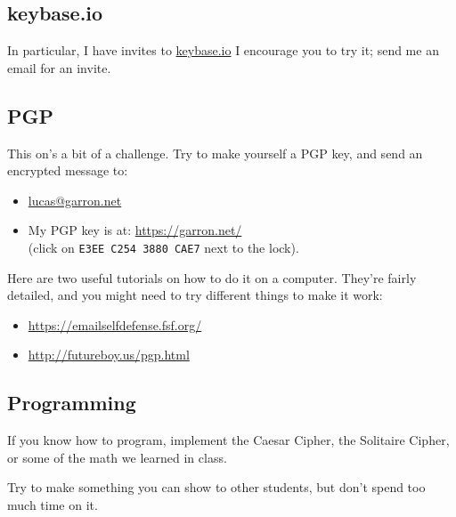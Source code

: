 \documentclass[12pt]{article}
\begin{document}
\subsection*{keybase.io}

In particular, I have invites to \href{https://keybase.io/}{keybase.io}
I encourage you to try it; send me an email for an invite.


\subsection*{PGP}

This on's a bit of a challenge. Try to make yourself a PGP key, and send an encrypted message to:

\begin{itemize}
\item \href{mailto:lucas@garron.net}{lucas@garron.net}
\item My PGP key is at: \href{https://garron.net/lucas/lgarron-3880CAE7.asc}{https://garron.net/}\\(click on {\tt{E3EE C254 3880 CAE7}} next to the lock).
\end{itemize}


Here are two useful tutorials on how to do it on a computer. They're fairly detailed, and you might need to try different things to make it work:

\begin{itemize}
\item \href{https://emailselfdefense.fsf.org/}{https://emailselfdefense.fsf.org/}
\item \href{http://futureboy.us/pgp.html}{http://futureboy.us/pgp.html}
\end{itemize}

\subsection*{Programming}

If you know how to program, implement the Caesar Cipher, the Solitaire Cipher, or some of the math we learned in class.

Try to make something you can show to other students, but don't spend too much time on it.
\end{document}
